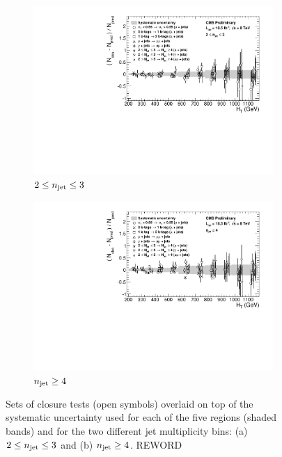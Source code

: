 \begin{figure}[h!]
  \centering
  \begin{subfigure}[b]{0.7\textwidth}
    \includegraphics[width=\textwidth]{Figs/syst/v0/le3j/summary_plot}
    \caption{$2 \leq n_{\text{jet}} \leq 3$}
    \label{fig:closure_summary_le3j}
  \end{subfigure}             
  \begin{subfigure}[b]{0.7\textwidth}
    \includegraphics[width=\textwidth]{Figs/syst/v0/ge4j/summary_plot}
    \caption{$n_{\text{jet}} \geq 4$}
    \label{fig:closure_summary_ge4j}
  \end{subfigure}             
  \caption{Sets of closure tests (open symbols) overlaid on top of
      the systematic uncertainty used for each of the five \HT
      regions (shaded bands) and for the two different jet
      multiplicity bins: (a) $2 \leq n_{\text{jet}} \leq 3$ and (b) $n_{\text{jet}} \geq
      4$. REWORD}
  \label{fig:closure_summary}
\end{figure}

